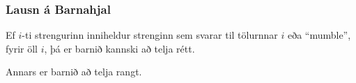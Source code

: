 {
	\frametitle{Lausn á Barnahjal}
	{
		\item<1-> Ef $i$-ti strengurinn inniheldur strenginn sem svarar til tölurnnar $i$ eða ``mumble'', fyrir öll $i$,
			þá er barnið kannski að telja rétt.
		\item<2-> Annars er barnið að telja rangt.
	}
}

{
}




